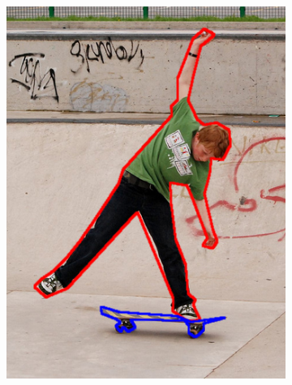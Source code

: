 \begin{figure}[H]
\begin{subfigure}[b]{0.2\textwidth}
        \includegraphics[width=\textwidth]{Figs/Problem/objfieldsfiguresegmentation.png}
        \caption{}\label{fig:objfig}
    \end{subfigure}
    \begin{subfigure}[b]{0.2\textwidth}
        \center

\end{subfigure}
\end{figure}

